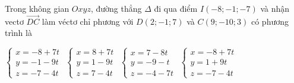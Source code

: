 \documentclass[12pt,a4paper]{article}
\begin{document}
\begin{ex}
 Trong không gian ${Oxyz}$, đường thẳng ${\Delta}$ đi qua điểm ${I(-8;-1;-7)}$ và nhận vectơ $\overrightarrow{DC}$ làm véctơ chỉ phương với $D(2;-1;7)$ và $C(9;-10;3)$ có phương trình là
 
\choice
{ \True $\left\{ \begin{array}{l}x = -8+7t\\ y = -1-9t\\z = -7-4t\end{array} \right.$ }
   { $\left\{ \begin{array}{l}x = 8+7t\\ y = 1-9t\\z = 7-4t\end{array} \right.$ }
     { $\left\{ \begin{array}{l}x = 7-8t\\ y = -9-t\\z = -4-7t\end{array} \right.$ }
    { $\left\{ \begin{array}{l}x = -8+7t\\ y = 1+9t\\z = -7-4t\end{array} \right.$ }
\end{ex}
\end{document}
